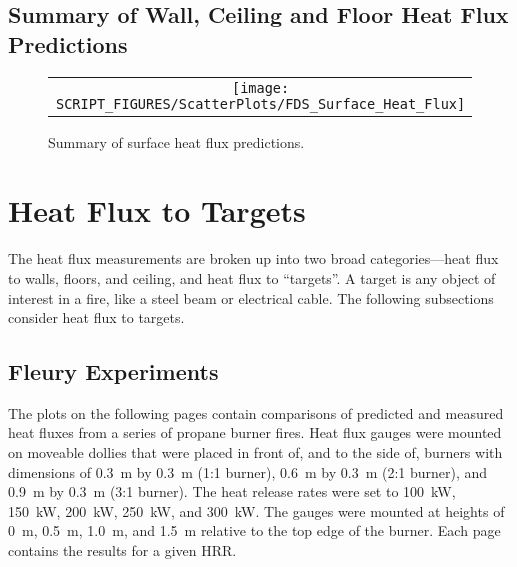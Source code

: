\clearpage


\subsection{Summary of Wall, Ceiling and Floor Heat Flux Predictions}
\label{Surface Heat Flux}


\begin{figure}[h!]
\begin{center}
\begin{tabular}{c}
\texttt{[image: SCRIPT\_FIGURES/ScatterPlots/FDS\_Surface\_Heat\_Flux]}
\end{tabular}
\end{center}
\caption[Summary of compartment surface heat flux predictions]
{Summary of surface heat flux predictions.}
\label{Summary_Surface_Heat_Flux}
\end{figure}



\clearpage

\section{Heat Flux to Targets}

The heat flux measurements are broken up into two broad categories---heat flux to walls, floors, and ceiling, and heat flux to ``targets''. A target is any object of interest in a fire, like a steel beam or electrical cable. The following subsections consider heat flux to targets.


\subsection{Fleury Experiments}

The plots on the following pages contain comparisons of predicted and measured heat fluxes from a series of propane burner fires. Heat flux gauges were mounted on moveable dollies that were placed in front of, and to the side of, burners with dimensions of 0.3~m by 0.3~m (1:1 burner), 0.6~m by 0.3~m (2:1 burner), and 0.9~m by 0.3~m (3:1 burner). The heat release rates were set to 100~kW, 150~kW, 200~kW, 250~kW, and 300~kW. The gauges were mounted at heights of 0~m, 0.5~m, 1.0~m, and 1.5~m relative to the top edge of the burner. Each page contains the results for a given HRR.

\newpage

